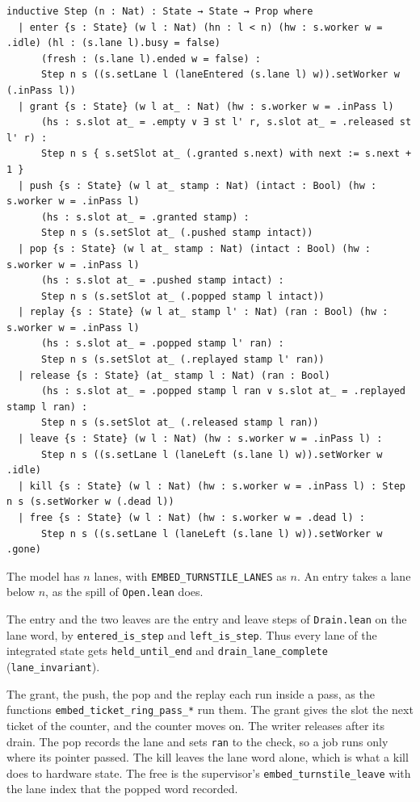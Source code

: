 \begin{Verbatim}
inductive Step (n : Nat) : State → State → Prop where
  | enter {s : State} (w l : Nat) (hn : l < n) (hw : s.worker w = .idle) (hl : (s.lane l).busy = false)
      (fresh : (s.lane l).ended w = false) :
      Step n s ((s.setLane l (laneEntered (s.lane l) w)).setWorker w (.inPass l))
  | grant {s : State} (w l at_ : Nat) (hw : s.worker w = .inPass l)
      (hs : s.slot at_ = .empty ∨ ∃ st l' r, s.slot at_ = .released st l' r) :
      Step n s { s.setSlot at_ (.granted s.next) with next := s.next + 1 }
  | push {s : State} (w l at_ stamp : Nat) (intact : Bool) (hw : s.worker w = .inPass l)
      (hs : s.slot at_ = .granted stamp) :
      Step n s (s.setSlot at_ (.pushed stamp intact))
  | pop {s : State} (w l at_ stamp : Nat) (intact : Bool) (hw : s.worker w = .inPass l)
      (hs : s.slot at_ = .pushed stamp intact) :
      Step n s (s.setSlot at_ (.popped stamp l intact))
  | replay {s : State} (w l at_ stamp l' : Nat) (ran : Bool) (hw : s.worker w = .inPass l)
      (hs : s.slot at_ = .popped stamp l' ran) :
      Step n s (s.setSlot at_ (.replayed stamp l' ran))
  | release {s : State} (at_ stamp l : Nat) (ran : Bool)
      (hs : s.slot at_ = .popped stamp l ran ∨ s.slot at_ = .replayed stamp l ran) :
      Step n s (s.setSlot at_ (.released stamp l ran))
  | leave {s : State} (w l : Nat) (hw : s.worker w = .inPass l) :
      Step n s ((s.setLane l (laneLeft (s.lane l) w)).setWorker w .idle)
  | kill {s : State} (w l : Nat) (hw : s.worker w = .inPass l) : Step n s (s.setWorker w (.dead l))
  | free {s : State} (w l : Nat) (hw : s.worker w = .dead l) :
      Step n s ((s.setLane l (laneLeft (s.lane l) w)).setWorker w .gone)
\end{Verbatim}

The model has \(n\) lanes, with \texttt{EMBED\_\allowbreak{}TURNSTILE\_\allowbreak{}LANES} as \(n\). An entry takes a lane below \(n\), as the spill of \texttt{Open.\allowbreak{}lean} does.

The entry and the two leaves are the entry and leave steps of \texttt{Drain.\allowbreak{}lean} on the lane word, by \texttt{entered\_\allowbreak{}is\_\allowbreak{}step} and \texttt{left\_\allowbreak{}is\_\allowbreak{}step}. Thus every lane of the integrated state gets \texttt{held\_\allowbreak{}until\_\allowbreak{}end} and \texttt{drain\_\allowbreak{}lane\_\allowbreak{}complete} (\texttt{lane\_\allowbreak{}invariant}).

The grant, the push, the pop and the replay each run inside a pass, as the functions \texttt{embed\_\allowbreak{}ticket\_\allowbreak{}ring\_\allowbreak{}pass\_\allowbreak{}*} run them. The grant gives the slot the next ticket of the counter, and the counter moves on. The writer releases after its drain. The pop records the lane and sets \texttt{ran} to the check, so a job runs only where its pointer passed. The kill leaves the lane word alone, which is what a kill does to hardware state. The free is the supervisor's \texttt{embed\_\allowbreak{}turnstile\_\allowbreak{}leave} with the lane index that the popped word recorded.

